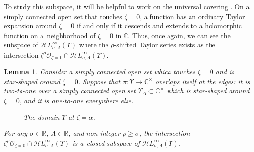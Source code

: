 \documentclass[pdftex]{sigma}
\newcommand{\singexp}[2]{\mathcal{H}L^\infty_{#1, #2}}
\newcommand{\maps}{\colon}
\newcommand{\R}{\mathbb{R}}
\newcommand{\C}{\mathbb{C}}
\numberwithin{equation}{section}
\newtheorem{Lemma}[Theorem]{Lemma}
\begin{document}
To study this subspace, it will be helpful to work on the universal covering \smash{$\pi \maps \widetilde{\C^\times} \to \C^\times$}. On a simply connected open set \smash{$\Upsilon \subset \widetilde{\C^\times}$} that touches $\zeta = 0$, a function has an ordinary Taylor expansion around $\zeta = 0$ if and only if it descends and extends to a holomorphic function on a~neighborhood of $\zeta = 0$ in $\C$. Thus, once again, we can see the subspace of $\singexp{\sigma}{\Lambda}(\Upsilon)$ where the $\rho$-shifted Taylor series exists as the intersection
$ \zeta^\rho \mathcal{O}_{\zeta = 0} \cap \singexp{\sigma}{\Lambda}(\Upsilon)$.
\begin{Lemma}\label{lem:shifted_holo_closed}
Consider a simply connected open set \smash{$\Upsilon \subset \widetilde{\C^\times}$} which touches $\zeta = 0$ and is star-shaped around $\zeta = 0$. Suppose that $\pi \maps \Upsilon \to \C^\times$ overlaps itself at the edges: it is two-to-one over a simply connected open set $\Upsilon_\Delta \subset \C^\times$ which is star-shaped around $\zeta = 0$, and it is one-to-one everywhere else.

\begin{figure}[!ht]\centering\vspace{-15mm}

\hspace*{-19mm}\vspace{-14mm}

\caption{The domain $\Upsilon$ at $\zeta=\alpha$.}\label{fig:domain_Upsilon}
\end{figure}

\noindent
For any $\sigma \in \R$, $\Lambda \in \R$, and non-integer $\rho \ge \sigma$, the intersection~${\zeta^\rho \mathcal{O}_{\zeta = 0} \cap \singexp{\sigma}{\Lambda}(\Upsilon)}$
is a~closed subspace of $\singexp{\sigma}{\Lambda}(\Upsilon)$.
\end{Lemma}
\end{document}
